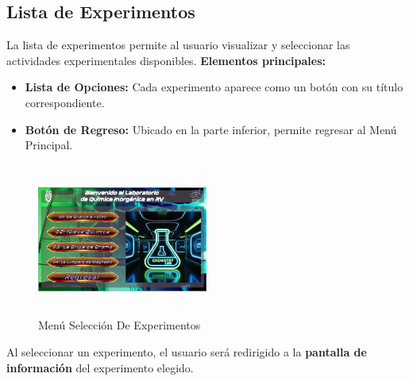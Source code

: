 \subsection{Lista de Experimentos}
La lista de experimentos permite al usuario visualizar y seleccionar las actividades experimentales disponibles.
\textbf{Elementos principales:}
\begin{itemize}
    \item \textbf{Lista de Opciones:} Cada experimento aparece como un botón con su título correspondiente.
    \item \textbf{Botón de Regreso:} Ubicado en la parte inferior, permite regresar al Menú Principal.
\end{itemize}
\begin{figure}[thbp]
    \centering
    \includegraphics[width=0.5\textwidth, height = 5cm]{img/GUI/UI_Hub_Experiments (2).png}
    \caption{Menú Selección De Experimentos}
    \label{fig:Selección_De_Experimentos}
\end{figure}
Al seleccionar un experimento, el usuario será redirigido a la \textbf{pantalla de información} del experimento elegido.
\newpage

